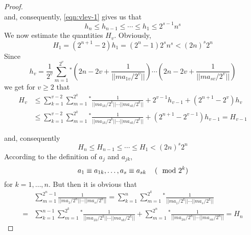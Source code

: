 \documentclass[a4paper, 12pt]{article}
\begin{document}
\begin{proof}
\begin{equation*}
\end{equation*}
and, consequently, \ref{eqn:vlev-1} gives us that
\begin{equation*}
h_n \le h_{n-1} \le \cdots \le h_1 \le 2^{s-1}n^s
\end{equation*}
We now estimate the quantities $H_v$. Obviously,
\begin{equation*}
H_1=(2^{n+1}-2)h_1=(2^n-1)2^sn^s<(2n)^s2^n
\end{equation*}
Since
\begin{equation*}
h_v=\frac{1}{2^v}\sum_{m=1}^{2^v}{}^*\left(2n-2v+\frac{1}{||ma_{1v}/2^v||}\right)\cdots\left(2n-2v+\frac{1}{||ma_{sv}/2^v||}\right)\end{equation*}
we get for $v\ge2$ that
\begin{align*}
H_v &\le \sum_{k=1}^{v-2} \sum_{m=1}^{2^k} {}^*\frac{1}{||ma_{1k}/2^k|| \cdots ||ma_{sk}/2^k||}+2^{v-1}h_{v-1}+(2^{n+1}-2^v)h_v \\
&\le \sum_{k=1}^{v-2} \sum_{m=1}^{2^k} {}^*\frac{1}{||ma_{1k}/2^k|| \cdots ||ma_{sk}/2^k||}+(2^{n+1}-2^{v-1})h_{v-1}=H_{v-1}
\end{align*}

and, consequently
\begin{equation}
H_n \le H_{n-1} \le \cdots \le H_1 < (2n)^s2^n
\end{equation}
According to the definition of $a_j$ and $a_{jk}$,
\begin{equation*}
a_1 \equiv a_{1k},\dots,a_s \equiv a_{sk}\mbox{\hspace{12pt}} (\mod{2^k})
\end{equation*}
for $k=1,\dots,n$. But then it is obvious that
\begin{align*}
&\sum_{m=1}^{2^n-1}\frac{1}{||ma_{1}/2^n|| \cdots ||ma_{s}/2^n||} = \sum_{k=1}^n\sum_{m=1}^{2^k}{}^*\frac{1}{||ma_{1}/2^k|| \cdots ||ma_{s}/2^k||}\\
=&\sum_{k=1}^{n-1}\sum_{m=1}^{2^k}{}^*\frac{1}{||ma_{1k}/2^k|| \cdots ||ma_{sk}/2^k||}+\sum_{m=1}^{2^n}{}^*\frac{1}{||ma_{1n}/2^n|| \cdots ||ma_{sn}/2^n||}=H_n
\end{align*}
\end{proof}
\end{document}
